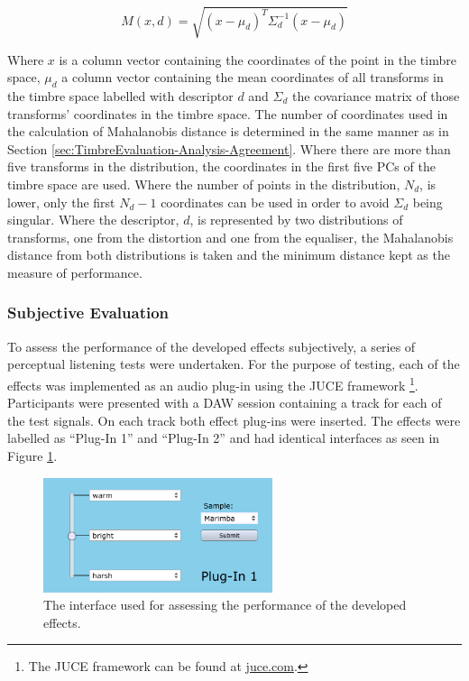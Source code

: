 			\begin{equation}
				M(x, d) = \sqrt{(x - \mu_{d})^{T}\Sigma_{d}^{-1}(x - \mu_{d})}
				\label{eq:Mahalanobis}
			\end{equation}

			Where $x$ is a column vector containing the coordinates of the point in the timbre space, $\mu_{d}$
			a column vector containing the mean coordinates of all transforms in the timbre space labelled with
			descriptor $d$ and $\Sigma_{d}$ the covariance matrix of those transforms' coordinates in the
			timbre space. The number of coordinates used in the calculation of Mahalanobis distance is
			determined in the same manner as in Section \ref{sec:TimbreEvaluation-Analysis-Agreement}. Where
			there are more than five transforms in the distribution, the coordinates in the first five PCs of
			the timbre space are used. Where the number of points in the distribution, $N_{d}$, is lower, only
			the first $N_{d} - 1$ coordinates can be used in order to avoid $\Sigma_{d}$ being singular. Where
			the descriptor, $d$, is represented by two distributions of transforms, one from the distortion and
			one from the equaliser, the Mahalanobis distance from both distributions is taken and the minimum
			distance kept as the measure of performance.
	
		\subsubsection*{Subjective Evaluation}
			To assess the performance of the developed effects subjectively, a series of perceptual listening
			tests were undertaken. For the purpose of testing, each of the effects was implemented as an audio
			plug-in using the JUCE framework \footnote{The JUCE framework can be found at
			\href{https://juce.com}{juce.com}.}. Participants were presented with a DAW session containing a
			track for each of the test signals. On each track both effect plug-ins were inserted. The effects
			were labelled as ``Plug-In 1'' and ``Plug-In 2'' and had identical interfaces as seen in Figure
			\ref{fig:TestPlugInterface}.

			\begin{figure}[h!]
				\centering
				\includegraphics[width=0.6\textwidth]{chapter7/Images/TestPlugInInterface.png}
				\caption{The interface used for assessing the performance of the developed effects.}
				\label{fig:TestPlugInterface}
			\end{figure}

